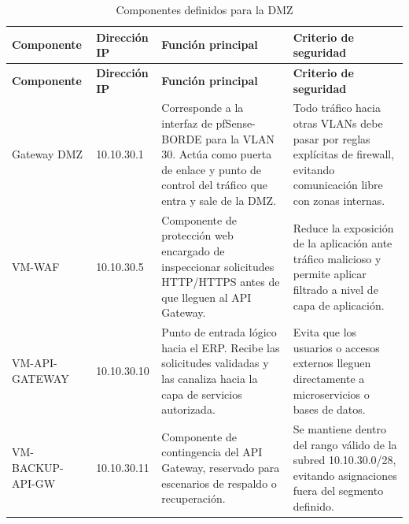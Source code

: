 \documentclass[11pt, a4paper, oneside]{report}
\begin{document}
\begin{xltabular}{\textwidth}{@{}|L{3cm}|L{3.2cm}|X|X|@{}}
\caption{Componentes definidos para la DMZ}
\label{tab:componentes_dmz} \\

\parbox[c][1.1cm][c]{\linewidth}{\centering\color{white}\bfseries\small Componente} &
\parbox[c][1.1cm][c]{\linewidth}{\centering\color{white}\bfseries\small Dirección IP} &
\parbox[c][1.1cm][c]{\linewidth}{\centering\color{white}\bfseries\small Función principal} &
\parbox[c][1.1cm][c]{\linewidth}{\centering\color{white}\bfseries\small Criterio de seguridad} \\ \hline
\endfirsthead

\parbox[c][1.1cm][c]{\linewidth}{\centering\color{white}\bfseries\small Componente} &
\parbox[c][1.1cm][c]{\linewidth}{\centering\color{white}\bfseries\small Dirección IP} &
\parbox[c][1.1cm][c]{\linewidth}{\centering\color{white}\bfseries\small Función principal} &
\parbox[c][1.1cm][c]{\linewidth}{\centering\color{white}\bfseries\small Criterio de seguridad} \\ \hline
\endhead

\hline
\endfoot

{\small Gateway DMZ} &
{\small 10.10.30.1} &
{\small Corresponde a la interfaz de pfSense-BORDE para la VLAN 30. Actúa como puerta de enlace y punto de control del tráfico que entra y sale de la DMZ.} &
{\small Todo tráfico hacia otras VLANs debe pasar por reglas explícitas de firewall, evitando comunicación libre con zonas internas.} \\ \hline

{\small VM-WAF} &
{\small 10.10.30.5} &
{\small Componente de protección web encargado de inspeccionar solicitudes HTTP/HTTPS antes de que lleguen al API Gateway.} &
{\small Reduce la exposición de la aplicación ante tráfico malicioso y permite aplicar filtrado a nivel de capa de aplicación.} \\ \hline

{\small VM-API-GATEWAY} &
{\small 10.10.30.10} &
{\small Punto de entrada lógico hacia el ERP. Recibe las solicitudes validadas y las canaliza hacia la capa de servicios autorizada.} &
{\small Evita que los usuarios o accesos externos lleguen directamente a microservicios o bases de datos.} \\ \hline

{\small VM-BACKUP-API-GW} &
{\small 10.10.30.11} &
{\small Componente de contingencia del API Gateway, reservado para escenarios de respaldo o recuperación.} &
{\small Se mantiene dentro del rango válido de la subred 10.10.30.0/28, evitando asignaciones fuera del segmento definido.} \\ \hline

\end{xltabular}
\end{document}

